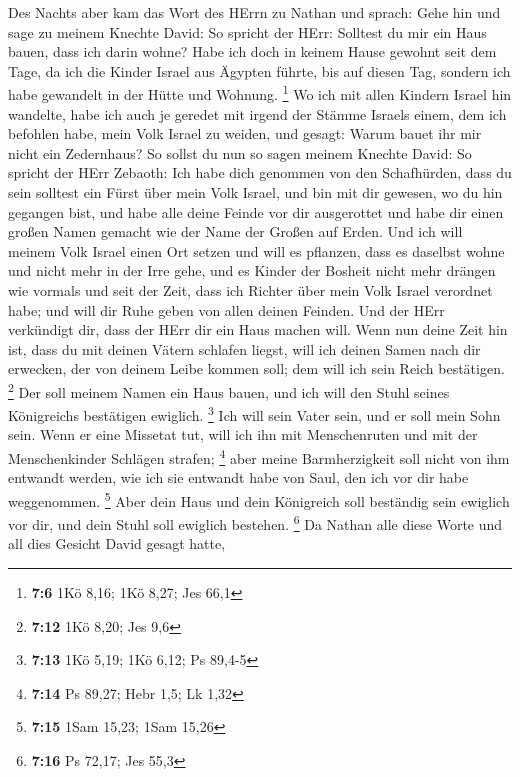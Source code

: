 Des Nachts aber kam das Wort des HErrn zu Nathan und
sprach:  Gehe hin und sage zu meinem Knechte David: So
spricht der HErr: Solltest du mir ein Haus bauen, dass ich darin wohne?
 Habe ich doch in keinem Hause gewohnt seit dem Tage, da ich
die Kinder Israel aus Ägypten führte, bis auf diesen Tag, sondern ich
habe gewandelt in der Hütte und Wohnung. \footnote{\textbf{7:6} 1Kö
  8,16; 1Kö 8,27; Jes 66,1}  Wo ich mit allen Kindern Israel
hin wandelte, habe ich auch je geredet mit irgend der Stämme Israels
einem, dem ich befohlen habe, mein Volk Israel zu weiden, und gesagt:
Warum bauet ihr mir nicht ein Zedernhaus?  So sollst du nun
so sagen meinem Knechte David: So spricht der HErr Zebaoth: Ich habe
dich genommen von den Schafhürden, dass du sein solltest ein Fürst über
mein Volk Israel,  und bin mit dir gewesen, wo du hin
gegangen bist, und habe alle deine Feinde vor dir ausgerottet und habe
dir einen großen Namen gemacht wie der Name der Großen auf Erden.
 Und ich will meinem Volk Israel einen Ort setzen und will
es pflanzen, dass es daselbst wohne und nicht mehr in der Irre gehe, und
es Kinder der Bosheit nicht mehr drängen wie vormals und seit der Zeit,
dass ich Richter über mein Volk Israel verordnet habe;  und
will dir Ruhe geben von allen deinen Feinden. Und der HErr verkündigt
dir, dass der HErr dir ein Haus machen will.  Wenn nun
deine Zeit hin ist, dass du mit deinen Vätern schlafen liegst, will ich
deinen Samen nach dir erwecken, der von deinem Leibe kommen soll; dem
will ich sein Reich bestätigen. \footnote{\textbf{7:12} 1Kö 8,20; Jes
  9,6}  Der soll meinem Namen ein Haus bauen, und ich will
den Stuhl seines Königreichs bestätigen ewiglich. \footnote{\textbf{7:13}
  1Kö 5,19; 1Kö 6,12; Ps 89,4-5}  Ich will sein Vater sein,
und er soll mein Sohn sein. Wenn er eine Missetat tut, will ich ihn mit
Menschenruten und mit der Menschenkinder Schlägen strafen; \footnote{\textbf{7:14}
  Ps 89,27; Hebr 1,5; Lk 1,32}  aber meine Barmherzigkeit
soll nicht von ihm entwandt werden, wie ich sie entwandt habe von Saul,
den ich vor dir habe weggenommen. \footnote{\textbf{7:15} 1Sam 15,23;
  1Sam 15,26}  Aber dein Haus und dein Königreich soll
beständig sein ewiglich vor dir, und dein Stuhl soll ewiglich bestehen.
\footnote{\textbf{7:16} Ps 72,17; Jes 55,3}  Da Nathan alle
diese Worte und all dies Gesicht David gesagt hatte,

